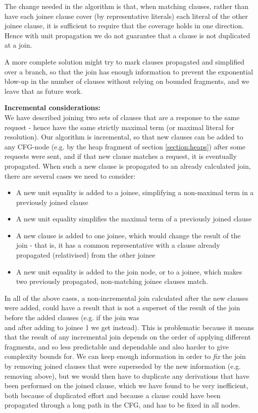The change needed in the algorithm is that, when matching clauses, rather than have each joinee clause cover (by representative literals) 
each literal of the other joinee clause, it is sufficient to require that the coverage holds in one direction. Hence with unit propagation we do not guarantee that a clause is not duplicated at a join.

A more complete solution might try to mark clauses propagated and simplified over a branch, 
so that the join has enough information to prevent the exponential blow-up in the number of clauses without relying on bounded fragments, and we leave that as future work.

\bigskip

\noindent
\textbf{Incremental considerations:}\\
We have described joining two sets of clauses that are a response to the same request - hence have the same strictly maximal term (or maximal literal for resolution).
Our algorithm is incremental, so that new clauses can be added to any CFG-node (e.g. by the heap fragment of section \ref{section:heaps}) after some requests were sent, and if that new clause matches a request, it is eventually propagated. 
When such a new clause is propagated to an already calculated join, there are several cases we need to consider:

\begin{itemize}
	\item A new unit equality is added to a joinee, simplifying a non-maximal term in a previously joined clause
	\item A new unit equality simplifies the maximal term of a previously joined clause
	\item A new clause is added to one joinee, which would change the result of the join - that is, it has a common representative with a clause already propagated (relativised) from the other joinee
	\item A new unit equality is added to the join node, or to a joinee, which makes two previously propagated, non-matching joinee clauses match.
\end{itemize}
In all of the above cases, a non-incremental join calculated after the new clauses were added, could have a result that is not a superset of the result of the join before the added clauses (e.g. if the join was\\ 
and after adding  to joinee 1 we get  instead).
This is problematic because it means that the result of any incremental join depends on the order of applying different fragments, and so less predictable and dependable and also harder to give complexity bounds for.
We can keep enough information in order to \emph{fix} the join by removing joined clauses that were superseded by the new information 
(e.g. removing  above), but we would then have to duplicate any derivations that have been performed on the joined clause, which we have found to be very inefficient, both because of duplicated effort and because a clause could have been propagated through a long path in the CFG, and has to be fixed in all nodes.


